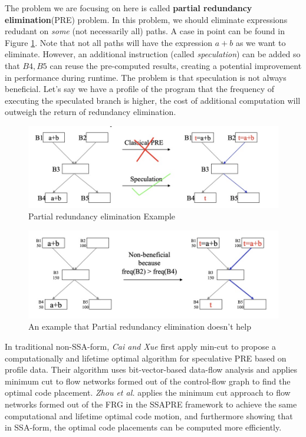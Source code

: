 \begin{exercise}[]
\begin{solution}
  The problem we are focusing on here is called \textbf{partial redundancy elimination}(PRE) problem. In this problem, we should eliminate expressions redudant on \textit{some} (not necessarily all) paths. A case in point can be found in Figure \ref{pre}. Note that not all paths will have the expression $a+b$ as we want to eliminate. However, an additional instruction (called \textit{speculation}) can be added so that $B4,B5$ can reuse the pre-computed results, creating a potential improvement in performance during runtime. The problem is that speculation is not always beneficial. Let's say we have a profile of the program that the frequency of executing the speculated branch is higher, the cost of additional computation will outweigh the return of redundancy elimination.
  
  \begin{figure}
    \centering
    \includegraphics[width=12cm]{img/ex6-pre1.jpg}
    \caption{Partial redundancy elimination Example}
    \label{pre}
  \end{figure}
  \begin{figure}
    \centering
    \includegraphics[width=12cm]{img/ex6-pre2.jpg}
    \caption{An example that Partial redundancy elimination doesn't help}
    \label{pre2}
  \end{figure}

  In traditional non-SSA-form, \textit{Cai and Xue} first apply min-cut to propose a computationally and lifetime optimal algorithm for speculative PRE based on profile data. Their algorithm uses bit-vector-based data-flow analysis and applies minimum cut to flow networks formed out of the control-flow graph to find the optimal code placement. \textit{Zhou et al.} applies the minimum cut approach to flow networks formed out of the FRG in the SSAPRE framework to achieve the same computational and lifetime optimal code motion, and furthermore showing that in SSA-form, the optimal code placements can be computed more efficiently. 
  

\end{solution}
\end{exercise}
